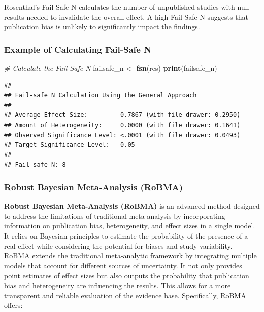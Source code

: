 \documentclass[
]{book}
\newenvironment{Shaded}{\begin{snugshade}}{\end{snugshade}}
\newcommand{\CommentTok}[1]{\textcolor[rgb]{0.56,0.35,0.01}{\textit{#1}}}
\newcommand{\FunctionTok}[1]{\textcolor[rgb]{0.13,0.29,0.53}{\textbf{#1}}}
\newcommand{\NormalTok}[1]{#1}
\newcommand{\OtherTok}[1]{\textcolor[rgb]{0.56,0.35,0.01}{#1}}
\begin{document}
Rosenthal's Fail-Safe N calculates the number of unpublished studies with null results needed to invalidate the overall effect. A high Fail-Safe N suggests that publication bias is unlikely to significantly impact the findings.

\subsubsection{Example of Calculating Fail-Safe N}\label{example-of-calculating-fail-safe-n}

\begin{Shaded}
\begin{Highlighting}[]
\CommentTok{\# Calculate the Fail{-}Safe N}
\NormalTok{failsafe\_n }\OtherTok{\textless{}{-}} \FunctionTok{fsn}\NormalTok{(res)}
\FunctionTok{print}\NormalTok{(failsafe\_n)}
\end{Highlighting}
\end{Shaded}

\begin{verbatim}
## 
## Fail-safe N Calculation Using the General Approach
## 
## Average Effect Size:         0.7867 (with file drawer: 0.2950)
## Amount of Heterogeneity:     0.0000 (with file drawer: 0.1641)
## Observed Significance Level: <.0001 (with file drawer: 0.0493)
## Target Significance Level:   0.05
## 
## Fail-safe N: 8
\end{verbatim}

\subsubsection{Robust Bayesian Meta-Analysis (RoBMA)}\label{robust-bayesian-meta-analysis-robma}

\textbf{Robust Bayesian Meta-Analysis (RoBMA)} is an advanced method designed to address the limitations of traditional meta-analysis by incorporating information on publication bias, heterogeneity, and effect sizes in a single model. It relies on Bayesian principles to estimate the probability of the presence of a real effect while considering the potential for biases and study variability. RoBMA extends the traditional meta-analytic framework by integrating multiple models that account for different sources of uncertainty. It not only provides point estimates of effect sizes but also outputs the probability that publication bias and heterogeneity are influencing the results. This allows for a more transparent and reliable evaluation of the evidence base. Specifically, RoBMA offers:
\end{document}
